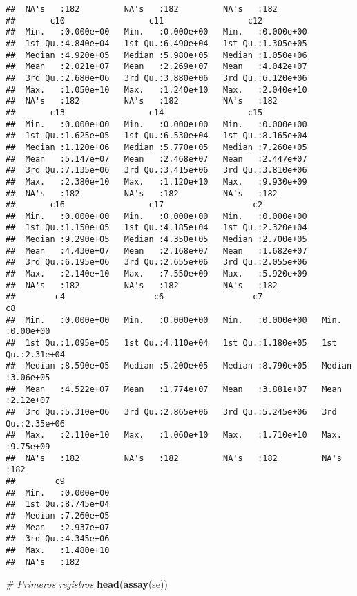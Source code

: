 \documentclass[
]{article}
\newenvironment{Shaded}{\begin{snugshade}}{\end{snugshade}}
\newcommand{\CommentTok}[1]{\textcolor[rgb]{0.56,0.35,0.01}{\textit{#1}}}
\newcommand{\FunctionTok}[1]{\textcolor[rgb]{0.13,0.29,0.53}{\textbf{#1}}}
\newcommand{\NormalTok}[1]{#1}
\begin{document}
\begin{verbatim}
##  NA's   :182         NA's   :182         NA's   :182        
##       c10                 c11                 c12           
##  Min.   :0.000e+00   Min.   :0.000e+00   Min.   :0.000e+00  
##  1st Qu.:4.840e+04   1st Qu.:6.490e+04   1st Qu.:1.305e+05  
##  Median :4.920e+05   Median :5.980e+05   Median :1.050e+06  
##  Mean   :2.021e+07   Mean   :2.269e+07   Mean   :4.042e+07  
##  3rd Qu.:2.680e+06   3rd Qu.:3.880e+06   3rd Qu.:6.120e+06  
##  Max.   :1.050e+10   Max.   :1.240e+10   Max.   :2.040e+10  
##  NA's   :182         NA's   :182         NA's   :182        
##       c13                 c14                 c15           
##  Min.   :0.000e+00   Min.   :0.000e+00   Min.   :0.000e+00  
##  1st Qu.:1.625e+05   1st Qu.:6.530e+04   1st Qu.:8.165e+04  
##  Median :1.120e+06   Median :5.770e+05   Median :7.260e+05  
##  Mean   :5.147e+07   Mean   :2.468e+07   Mean   :2.447e+07  
##  3rd Qu.:7.135e+06   3rd Qu.:3.415e+06   3rd Qu.:3.810e+06  
##  Max.   :2.380e+10   Max.   :1.120e+10   Max.   :9.930e+09  
##  NA's   :182         NA's   :182         NA's   :182        
##       c16                 c17                  c2           
##  Min.   :0.000e+00   Min.   :0.000e+00   Min.   :0.000e+00  
##  1st Qu.:1.150e+05   1st Qu.:4.185e+04   1st Qu.:2.320e+04  
##  Median :9.290e+05   Median :4.350e+05   Median :2.700e+05  
##  Mean   :4.430e+07   Mean   :2.168e+07   Mean   :1.682e+07  
##  3rd Qu.:6.195e+06   3rd Qu.:2.655e+06   3rd Qu.:2.055e+06  
##  Max.   :2.140e+10   Max.   :7.550e+09   Max.   :5.920e+09  
##  NA's   :182         NA's   :182         NA's   :182        
##        c4                  c6                  c7                  c8          
##  Min.   :0.000e+00   Min.   :0.000e+00   Min.   :0.000e+00   Min.   :0.00e+00  
##  1st Qu.:1.095e+05   1st Qu.:4.110e+04   1st Qu.:1.180e+05   1st Qu.:2.31e+04  
##  Median :8.590e+05   Median :5.200e+05   Median :8.790e+05   Median :3.06e+05  
##  Mean   :4.522e+07   Mean   :1.774e+07   Mean   :3.881e+07   Mean   :2.12e+07  
##  3rd Qu.:5.310e+06   3rd Qu.:2.865e+06   3rd Qu.:5.245e+06   3rd Qu.:2.35e+06  
##  Max.   :2.110e+10   Max.   :1.060e+10   Max.   :1.710e+10   Max.   :9.75e+09  
##  NA's   :182         NA's   :182         NA's   :182         NA's   :182       
##        c9           
##  Min.   :0.000e+00  
##  1st Qu.:8.745e+04  
##  Median :7.260e+05  
##  Mean   :2.937e+07  
##  3rd Qu.:4.345e+06  
##  Max.   :1.480e+10  
##  NA's   :182
\end{verbatim}

\begin{Shaded}
\begin{Highlighting}[]
\CommentTok{\# Primeros registros}
\FunctionTok{head}\NormalTok{(}\FunctionTok{assay}\NormalTok{(se))}
\end{Highlighting}
\end{Shaded}
\end{document}
